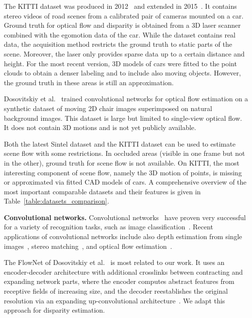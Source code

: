 \documentclass[10pt,twocolumn,letterpaper]{article}
\begin{document}
The KITTI dataset was produced in 2012~\cite{Geiger-et-al-13} and extended in 2015~\cite{Menze2015CVPR}. It contains stereo videos of road scenes from a calibrated pair of cameras mounted on a car. Ground truth for optical flow and disparity is obtained from a 3D laser scanner combined with the egomotion data of the car. While the dataset contains real data, the acquisition method restricts the ground truth to static parts of the scene. Moreover, the laser only provides sparse data up to a certain distance and height. For the most recent version, 3D models of cars were fitted to the point clouds to obtain a denser labeling and to include also moving objects. However, the ground truth in these areas is still an approximation. 

Dosovitskiy et al.~\cite{FlowNet} trained convolutional networks for optical flow estimation on a synthetic dataset of moving 2D chair images superimposed on natural background images.
This dataset is large but limited to single-view optical flow. It does not contain 3D motions and is not yet publicly available.

Both the latest Sintel dataset and the KITTI dataset can be used to estimate scene flow with some restrictions. In occluded areas (visible in one frame but not in the other), ground truth for scene flow is not available. On KITTI, the most interesting component of scene flow, namely the 3D motion of points, is missing or approximated via fitted CAD models of cars. A comprehensive overview of the most important comparable datasets and their features is given in Table~\ref{table:datasets_comparison}.


\textbf{Convolutional networks.}
Convolutional networks~\cite{lecun1989backpropagation} have proven very successful for a variety of recognition tasks, such as image classification~\cite{Krizhevsky-et-al-12}. Recent applications of convolutional networks include also depth estimation from single images~\cite{Eigen-et-al-14}, stereo matching~\cite{zbontar2015stereo}, and optical flow estimation~\cite{FlowNet}. 

The FlowNet of Dosovitskiy et al.~\cite{FlowNet} is most related to our work. It uses an encoder-decoder architecture with additional crosslinks between contracting and expanding network parts, where the encoder computes abstract features from receptive fields of increasing size, and the decoder reestablishes the original resolution via an expanding up-convolutional architecture~\cite{Dosovitskiy-15}. 
We adapt this approach for disparity estimation. 
\end{document}
